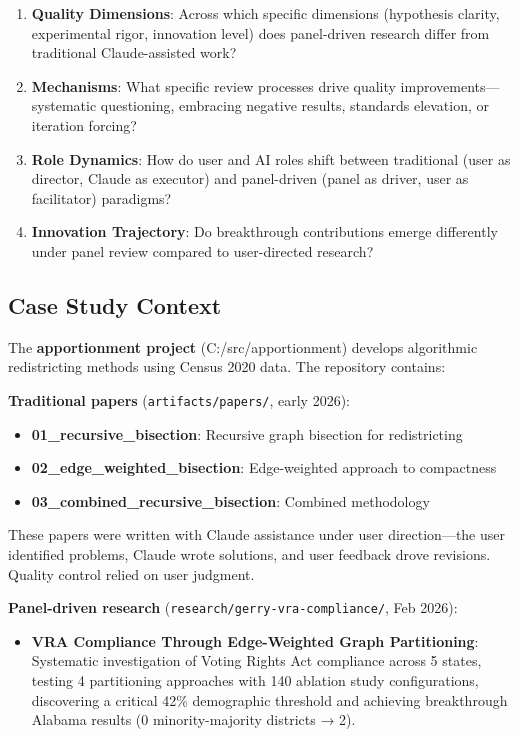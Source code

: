\begin{enumerate}[leftmargin=*]
\item \textbf{Quality Dimensions}: Across which specific dimensions (hypothesis clarity, experimental rigor, innovation level) does panel-driven research differ from traditional Claude-assisted work?

\item \textbf{Mechanisms}: What specific review processes drive quality improvements---systematic questioning, embracing negative results, standards elevation, or iteration forcing?

\item \textbf{Role Dynamics}: How do user and AI roles shift between traditional (user as director, Claude as executor) and panel-driven (panel as driver, user as facilitator) paradigms?

\item \textbf{Innovation Trajectory}: Do breakthrough contributions emerge differently under panel review compared to user-directed research?
\end{enumerate}

\subsection{Case Study Context}

The \textbf{apportionment project} (C:/src/apportionment) develops algorithmic redistricting methods using Census 2020 data. The repository contains:

\textbf{Traditional papers} (\texttt{artifacts/papers/}, early 2026):
\begin{itemize}[leftmargin=*]
\item \textbf{01\_recursive\_bisection}: Recursive graph bisection for redistricting
\item \textbf{02\_edge\_weighted\_bisection}: Edge-weighted approach to compactness
\item \textbf{03\_combined\_recursive\_bisection}: Combined methodology
\end{itemize}

These papers were written with Claude assistance under user direction---the user identified problems, Claude wrote solutions, and user feedback drove revisions. Quality control relied on user judgment.

\textbf{Panel-driven research} (\texttt{research/gerry-vra-compliance/}, Feb 2026):
\begin{itemize}[leftmargin=*]
\item \textbf{VRA Compliance Through Edge-Weighted Graph Partitioning}: Systematic investigation of Voting Rights Act compliance across 5 states, testing 4 partitioning approaches with 140 ablation study configurations, discovering a critical 42\% demographic threshold and achieving breakthrough Alabama results (0 minority-majority districts → 2).
\end{itemize}

